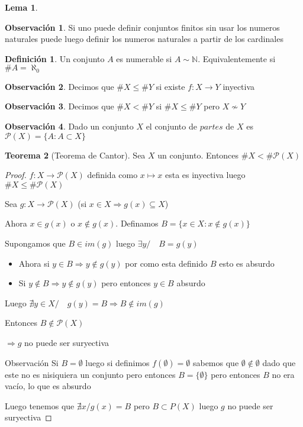 \documentclass[12pt]{article}
\newcommand{\n}{\aleph_{0}}
\newcommand{\N}{\mathbb{N}}
\newcommand{\Ra}{\Rightarrow}
\newcommand{\ra}{\rightarrow}
\theoremstyle{definition}
\newtheorem{definition}{Definición}[section]
\newtheorem*{remark}{Observación}
\newtheorem{theorem}{Teorema}
\newtheorem{lemma}[theorem]{Lema}
\begin{document}
\begin{lemma}
  \begin{remark}
    Si uno puede definir conjuntos finitos sin usar los numeros naturales puede luego definir los numeros naturales a partir de los cardinales 
  \end{remark}

  \begin{definition}
    Un conjunto $A$ es numerable si $A \sim \N$. Equivalentemente si $\# A = \n$
    
  \end{definition}
\end{lemma}

\begin{remark}
  Decimos que $\# X \leq \# Y$ si existe $f:X \ra Y$ inyectiva
\end{remark}
\begin{remark}
  Decimos que $\# X < \# Y$ si $\# X \leq \# Y$ pero $X \nsim Y$
\end{remark}

\begin{remark}
  Dado un conjunto $X$ el conjunto de $partes$ de $X$ es $\mathcal{P}(X) = \{A : A \subset X \}$
\end{remark}

\begin{theorem}[Teorema de Cantor]
Sea $X$ un conjunto. Entonces $\# X < \# \mathcal{P}(X)$

\begin{proof}
  $f:X \ra \mathcal{P}(X)$ definida como $x \mapsto {x}$ esta es inyectiva luego $\# X \leq \# \mathcal{P}(X)$

Sea $g: X \ra \mathcal{P}(X)$ (si $ x \in X  \Ra g(x) \subseteq X$)

Ahora $x \in g(x)$ o $x \notin g(x)$. Definamos $B =\{x \in X : x \notin g(x)\}$

Supongamos que $B \in im(g)$ luego $\exists y / \quad B=g(y)$ 
\begin{itemize}
\item Ahora si $y \in B \Ra y \notin g(y)$ por como esta definido $B$ esto es absurdo

\item Si $y \notin B \Ra y \notin g(y)$ pero entonces $y \in B$ absurdo
\end{itemize}

Luego $\nexists y \in X / \quad g(y) = B \Ra B \notin im(g)$ 

Entonces $B \notin \mathcal{P}(X)$

$\Ra g$ no puede ser suryectiva

Observación Si $B = \emptyset$ luego si definimos $f(\emptyset) = \emptyset$ sabemos que $\emptyset \notin \emptyset$ dado que este no es nisiquiera un conjunto pero entonces $B=\{\emptyset \}$ pero entonces $B$ no era vacío, lo que es absurdo

Luego tenemos que $\nexists x / g(x) = B $ pero $B \subset P(X)$ luego $g$ no puede ser suryectiva
\end{proof}
\end{theorem}
\end{document}
